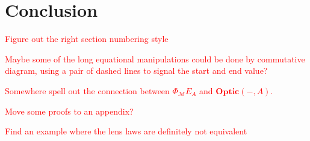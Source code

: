 \documentclass[11pt,letterpaper]{article}
\theoremstyle{plain}
\theoremstyle{definition}
\newcommand{\M}{\mathscr{M}}
\newcommand{\Pastro}{\Phi}
\newcommand{\Optic}{\mathbf{Optic}}
\newcommand{\todo}[1]{\textcolor{red}{\small #1}}
\begin{document}
\section{Conclusion}

\todo{Figure out the right section numbering style}

\todo{Maybe some of the long equational manipulations could be done by commutative diagram, using a pair of dashed lines to signal the start and end value?}

\todo{Somewhere spell out the connection between $\Pastro_\M E_A$ and $\Optic(-, A)$.}

\todo{Move some proofs to an appendix?}

\todo{Find an example where the lens laws are definitely not equivalent}



\end{document}
